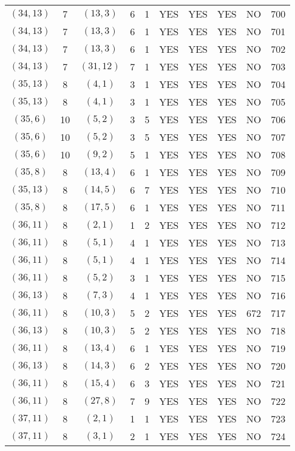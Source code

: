 \begin{longtable}{|c|c|c|c|c|c|c|c|c|c|}
$(34, 13)$ & 7 & $(13, 3)$ & 6 & 1 & YES & YES & YES & NO & 700\\
$(34, 13)$ & 7 & $(13, 3)$ & 6 & 1 & YES & YES & YES & NO & 701\\
$(34, 13)$ & 7 & $(13, 3)$ & 6 & 1 & YES & YES & YES & NO & 702\\
$(34, 13)$ & 7 & $(31, 12)$ & 7 & 1 & YES & YES & YES & NO & 703\\
$(35, 13)$ & 8 & $(4, 1)$ & 3 & 1 & YES & YES & YES & NO & 704\\
$(35, 13)$ & 8 & $(4, 1)$ & 3 & 1 & YES & YES & YES & NO & 705\\
$(35, 6)$ & 10 & $(5, 2)$ & 3 & 5 & YES & YES & YES & NO & 706\\
$(35, 6)$ & 10 & $(5, 2)$ & 3 & 5 & YES & YES & YES & NO & 707\\
$(35, 6)$ & 10 & $(9, 2)$ & 5 & 1 & YES & YES & YES & NO & 708\\
$(35, 8)$ & 8 & $(13, 4)$ & 6 & 1 & YES & YES & YES & NO & 709\\
$(35, 13)$ & 8 & $(14, 5)$ & 6 & 7 & YES & YES & YES & NO & 710\\
$(35, 8)$ & 8 & $(17, 5)$ & 6 & 1 & YES & YES & YES & NO & 711\\
$(36, 11)$ & 8 & $(2, 1)$ & 1 & 2 & YES & YES & YES & NO & 712\\
$(36, 11)$ & 8 & $(5, 1)$ & 4 & 1 & YES & YES & YES & NO & 713\\
$(36, 11)$ & 8 & $(5, 1)$ & 4 & 1 & YES & YES & YES & NO & 714\\
$(36, 11)$ & 8 & $(5, 2)$ & 3 & 1 & YES & YES & YES & NO & 715\\
$(36, 13)$ & 8 & $(7, 3)$ & 4 & 1 & YES & YES & YES & NO & 716\\
$(36, 11)$ & 8 & $(10, 3)$ & 5 & 2 & YES & YES & YES & 672 & 717\\
$(36, 13)$ & 8 & $(10, 3)$ & 5 & 2 & YES & YES & YES & NO & 718\\
$(36, 11)$ & 8 & $(13, 4)$ & 6 & 1 & YES & YES & YES & NO & 719\\
$(36, 13)$ & 8 & $(14, 3)$ & 6 & 2 & YES & YES & YES & NO & 720\\
$(36, 11)$ & 8 & $(15, 4)$ & 6 & 3 & YES & YES & YES & NO & 721\\
$(36, 11)$ & 8 & $(27, 8)$ & 7 & 9 & YES & YES & YES & NO & 722\\
$(37, 11)$ & 8 & $(2, 1)$ & 1 & 1 & YES & YES & YES & NO & 723\\
$(37, 11)$ & 8 & $(3, 1)$ & 2 & 1 & YES & YES & YES & NO & 724\\

\end{longtable}
